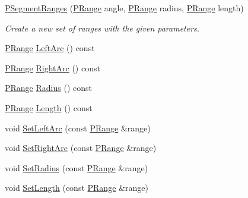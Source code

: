 \begin{DoxyCompactItemize}
\item 
\hypertarget{classprocedural_1_1_p_segment_ranges_a38e359da096762810cf039237f33603b}{\hyperlink{classprocedural_1_1_p_segment_ranges_a38e359da096762810cf039237f33603b}{P\-Segment\-Ranges} (\hyperlink{structprocedural_1_1_p_range}{P\-Range} angle, \hyperlink{structprocedural_1_1_p_range}{P\-Range} radius, \hyperlink{structprocedural_1_1_p_range}{P\-Range} length)}\label{classprocedural_1_1_p_segment_ranges_a38e359da096762810cf039237f33603b}

\begin{DoxyCompactList}\small\item\em Create a new set of ranges with the given parameters. \end{DoxyCompactList}\item 
\hyperlink{structprocedural_1_1_p_range}{P\-Range} \hyperlink{classprocedural_1_1_p_segment_ranges_a5f706d41b52eb9d13f3e966b9a55c1ff}{Left\-Arc} () const 
\item 
\hyperlink{structprocedural_1_1_p_range}{P\-Range} \hyperlink{classprocedural_1_1_p_segment_ranges_acc89a474c64acc887c209fb19d28d84a}{Right\-Arc} () const 
\item 
\hyperlink{structprocedural_1_1_p_range}{P\-Range} \hyperlink{classprocedural_1_1_p_segment_ranges_a083285054b7455a61306bc88e94cb1f0}{Radius} () const 
\item 
\hyperlink{structprocedural_1_1_p_range}{P\-Range} \hyperlink{classprocedural_1_1_p_segment_ranges_a846f74e17af2957871e9266742ee2cd8}{Length} () const 
\item 
void \hyperlink{classprocedural_1_1_p_segment_ranges_a837aa9a5914eafbc3c3265c372bca13f}{Set\-Left\-Arc} (const \hyperlink{structprocedural_1_1_p_range}{P\-Range} \&range)
\item 
void \hyperlink{classprocedural_1_1_p_segment_ranges_adefb935d34983da1b95dece233c3c4dc}{Set\-Right\-Arc} (const \hyperlink{structprocedural_1_1_p_range}{P\-Range} \&range)
\item 
void \hyperlink{classprocedural_1_1_p_segment_ranges_a2f9f9e86ae2e72d04935a660cee48e7f}{Set\-Radius} (const \hyperlink{structprocedural_1_1_p_range}{P\-Range} \&range)
\item 
void \hyperlink{classprocedural_1_1_p_segment_ranges_acad2fb79c89fa3ce5ea5aa9f04946de7}{Set\-Length} (const \hyperlink{structprocedural_1_1_p_range}{P\-Range} \&range)
\end{DoxyCompactItemize}
